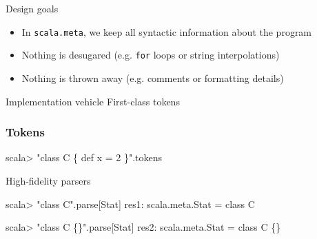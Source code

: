 \documentclass[svgnames,dvipsnames,hyperref={bookmarks=false},usepdftitle=false]{beamer}
\begin{document}
\begin{frame}{Design goals}
\begin{itemize}
\item In \texttt{scala.meta}, we keep all syntactic information about the program
\item Nothing is desugared (e.g. \texttt{for} loops or string interpolations)
\item Nothing is thrown away (e.g. comments or formatting details)
\end{itemize}
\end{frame}

\begin{frame}{Implementation vehicle}
First-class tokens
\end{frame}

\begin{frame}[fragile]
\frametitle<1-6>{Tokens}
\begin{semiverbatim}
scala> "\alert<2>{class} \alert<3>{C} \alert<4>{\{} \alert<2>{def} \alert<3>{x} \alert<4>{=} 2 \alert<4>{\}}".tokens
\end{semiverbatim}
\end{frame}

\begin{frame}[fragile]{High-fidelity parsers}
\begin{semiverbatim}
scala> "class C".parse[Stat]
res1: scala.meta.Stat = class C

scala> "class C \alert<2->{\{\}}".parse[Stat]
res2: scala.meta.Stat = class C \{\}


\end{semiverbatim}
\end{frame}
\end{document}
